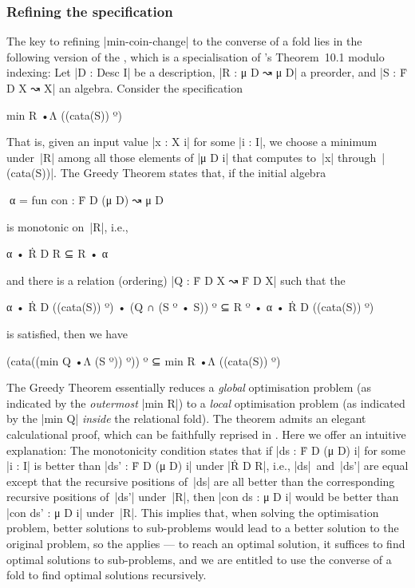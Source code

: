 \subsubsection{Refining the specification}

The key to refining |min-coin-change| to the converse of a fold lies in the following version of the , which is a specialisation of \citeauthor{Bird-AoP}'s Theorem~10.1 modulo indexing:
Let |D : Desc I| be a description, |R : μ D ↝ μ D| a preorder, and |S : Ḟ D X ↝ X| an algebra.
Consider the specification
\begin{code}
min R •Λ ((cata(S)) º)
\end{code}
That is, given an input value |x : X i| for some |i : I|, we choose a minimum under~|R| among all those elements of |μ D i| that computes to~|x| through~|(cata(S))|.
The Greedy Theorem states that, if the initial algebra
\begin{code}
^^^α = fun con : Ḟ D (μ D) ↝ μ D
\end{code}
is monotonic on~|R|, i.e.,
\begin{code}
α • Ṙ D R ⊆ R • α
\end{code}
and there is a relation (ordering) |Q : Ḟ D X ↝ Ḟ D X| such that the 
\begin{code}
α • Ṙ D ((cata(S)) º) • (Q ∩ (S º • S)) º ⊆ R º • α • Ṙ D ((cata(S)) º)
\end{code}
is satisfied, then we have
\begin{code}
(cata((min Q •Λ (S º)) º)) º ⊆ min R •Λ ((cata(S)) º)
\end{code}
The Greedy Theorem essentially reduces a \emph{global} optimisation problem (as indicated by the \emph{outermost} |min R|) to a \emph{local} optimisation problem (as indicated by the |min Q| \emph{inside} the relational fold).
The theorem admits an elegant calculational proof, which can be faithfully reprised in \Agda.
Here we offer an intuitive explanation:
The monotonicity condition states that if |ds : Ḟ D (μ D) i| for some |i : I| is better than |ds' : Ḟ D (μ D) i| under |Ṙ D R|, i.e., |ds|~and~|ds'| are equal except that the recursive positions of~|ds| are all better than the corresponding recursive positions of~|ds'| under~|R|, then |con ds : μ D i| would be better than |con ds' : μ D i| under~|R|.
This implies that, when solving the optimisation problem, better solutions to sub-problems would lead to a better solution to the original problem, so the  applies --- to reach an optimal solution, it suffices to find optimal solutions to sub-problems, and we are entitled to use the converse of a fold to find optimal solutions recursively.
